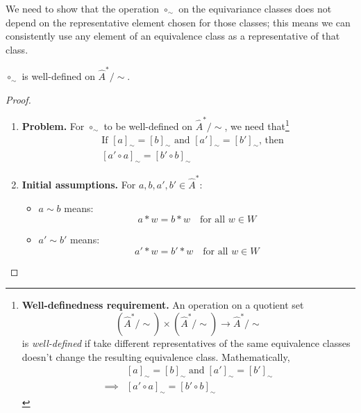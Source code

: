 We need to show that the operation $\circ_{\sim}$ on the equivariance classes does not depend on the representative element chosen for those classes; this means we can consistently use any element of an equivalence class as a representative of that class.

\begin{proposition}\label{prp:circ_sim_well_defined}
	$\circ_{\sim}$ is well-defined on $\hat{A}^{\ast}/\sim$.
\end{proposition}
\begin{proof}
	\begin{enumerate}
		\item \textbf{Problem.}
		      For $\circ_{\sim}$ to be well-defined on $\hat{A}^{*}/\sim$, we need that\footnote{
			      \textbf{Well-definedness requirement.}
			      An operation on a quotient set
			      \begin{equation}
				      (\hat{A}^{*}/\sim) \times (\hat{A}^{*}/\sim) \to \hat{A}^{*}/\sim
			      \end{equation}
			      is \emph{well-defined} if take different representatives of the same equivalence classes doesn't change the resulting equivalence class.
			      Mathematically,
			      \begin{equation}
				      \begin{aligned}
					               & [a]_{\sim} = [b]_{\sim} \; \text{and} \; [a']_{\sim} = [b']_{\sim} \\
					      \implies & [a' \circ a]_{\sim} = [b' \circ b]_{\sim}
				      \end{aligned}
			      \end{equation}
		      }
		      \begin{equation}
			      \begin{aligned}
				       & \text{If $[a]_{\sim} = [b]_{\sim}$ and $[a']_{\sim} = [b']_{\sim}$, then} \\
				       & [a' \circ a]_{\sim} = [b' \circ b]_{\sim}
			      \end{aligned}
		      \end{equation}

		\item \textbf{Initial assumptions.}
		      For $a, b, a', b' \in \hat{A}^{\ast}$:
		      \begin{itemize}
			      \item $a \sim b$ means:
			            \begin{equation}
				            a \ast w = b \ast w \quad \text{for all } w\in W
			            \end{equation}
			      \item $a' \sim b'$ means:
			            \begin{equation}
				            a' \ast w = b' \ast w \quad \text{for all } w\in W
			            \end{equation}
		      \end{itemize}


\end{enumerate}
\end{proof}
